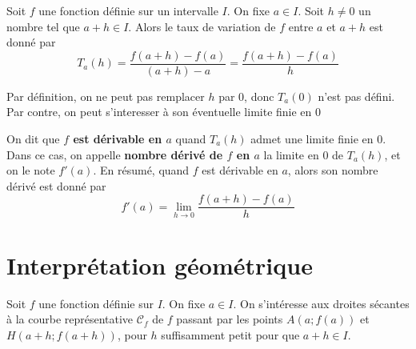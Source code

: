 \documentclass{poly}
\begin{document}
\begin{tcolorbox}
Soit $f$ une fonction définie sur un intervalle $I$. On fixe $a \in I$. Soit $h \neq 0$ un nombre tel que $a + h \in I$. Alors le taux de variation de $f$ entre $a$ et $a + h$ est donné par
\begin{equation*}
T_a(h) = \dfrac{f(a + h) - f(a)}{(a + h) - a} = \dfrac{f(a + h) - f(a)}{h}
\end{equation*}
\end{tcolorbox}
\begin{remark}
Par définition, on ne peut pas remplacer $h$ par $0$, donc $T_a(0)$ n'est pas défini. Par contre, on peut s'interesser à son éventuelle limite finie en $0$
\end{remark}
\begin{definition}
On dit que \textbf{$f$ est dérivable en $a$} quand $T_a(h)$ admet une limite finie en $0$. Dans ce cas, on appelle \textbf{nombre dérivé de $f$ en $a$} la limite en $0$ de $T_a(h)$, et on le note $f'(a)$. En résumé, quand $f$ est dérivable en $a$, alors son nombre dérivé est donné par
\begin{equation*}
f'(a) = \lim_{h \to 0} \dfrac{f(a + h) - f(a)}{h}
\end{equation*}
\end{definition}

\newpage
\section{Interprétation géométrique}
Soit $f$ une fonction définie sur $I$. On fixe $a \in I$. On s'intéresse aux droites sécantes à la courbe représentative $\mathcal{C}_f$ de $f$ passant par les points $A(a;f(a))$ et $H(a+h;f(a+h))$, pour $h$ suffisamment petit pour que $a + h \in I$.
\end{document}
